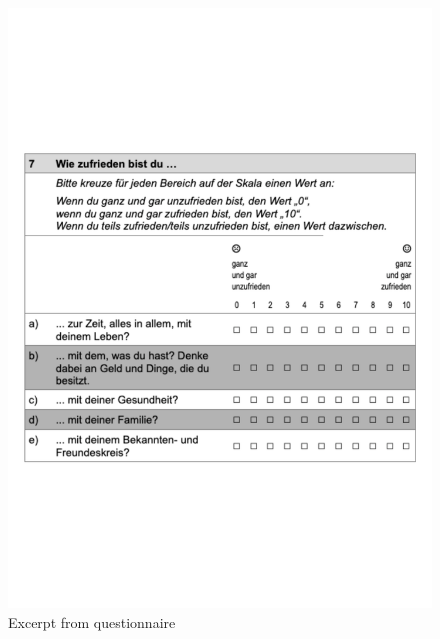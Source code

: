 \documentclass[a4, 12pt]{article}
\begin{document}
\begin{figure}[H]
\includegraphics[width=1\linewidth,]{../figures/Wie zufrieden bist du....pdf} \caption{Excerpt from questionnaire}\label{fig:questionnaire}
\end{figure}
\end{document}
